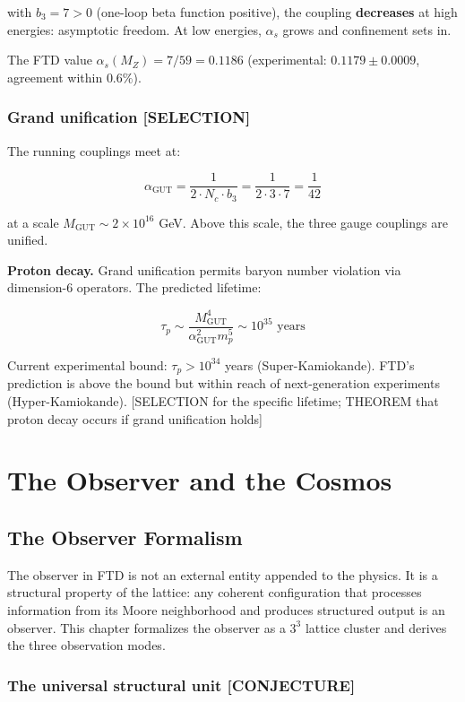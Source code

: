 \documentclass[
  11pt,
  letterpaper,
  twoside,
  openany]{book}
\makeatletter
\let\orig@section\section
\renewcommand{\section}{\needspace{8\baselineskip}\orig@section}
\makeatother
\begin{document}
with \(b_3 = 7 > 0\) (one-loop beta function positive), the coupling
\textbf{decreases} at high energies: asymptotic freedom. At low
energies, \(\alpha_s\) grows and confinement sets in.

The FTD value \(\alpha_s(M_Z) = 7/59 = 0.1186\) (experimental:
\(0.1179 \pm 0.0009\), agreement within \(0.6\%\)).

\section{Grand unification
{[}SELECTION{]}}\label{grand-unification-selection}

The running couplings meet at:

\[
\alpha_{\text{GUT}} = \frac{1}{2 \cdot N_c \cdot b_3} = \frac{1}{2 \cdot 3 \cdot 7} = \frac{1}{42}
\tag{18.5}
\]

at a scale \(M_{\text{GUT}} \sim 2 \times 10^{16}\) GeV. Above this
scale, the three gauge couplings are unified.

\textbf{Proton decay.} Grand unification permits baryon number violation
via dimension-6 operators. The predicted lifetime:

\[
\tau_p \sim \frac{M_{\text{GUT}}^4}{\alpha_{\text{GUT}}^2 m_p^5} \sim 10^{35} \text{ years}
\tag{18.6}
\]

Current experimental bound: \(\tau_p > 10^{34}\) years
(Super-Kamiokande). FTD's prediction is above the bound but within reach
of next-generation experiments (Hyper-Kamiokande). {[}SELECTION for the
specific lifetime; THEOREM that proton decay occurs if grand unification
holds{]}

\part{The Observer and the Cosmos}

\chapter{The Observer Formalism}\label{sec-observer}

The observer in FTD is not an external entity appended to the physics.
It is a structural property of the lattice: any coherent configuration
that processes information from its Moore neighborhood and produces
structured output is an observer. This chapter formalizes the observer
as a \(3^3\) lattice cluster and derives the three observation modes.

\section{The universal structural unit
{[}CONJECTURE{]}}\label{the-universal-structural-unit-conjecture}
\end{document}
